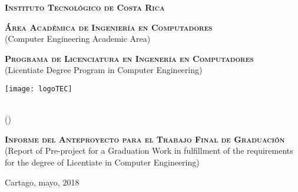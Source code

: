 
\thispagestyle{empty} 

\begin{center}

\textsc{\large \textbf{Instituto Tecnol\'ogico de Costa Rica}} \\
\par\vspace{7mm}


\textsc{\large \textbf{\'Area Acad\'emica de Ingenier\'ia en Computadores}}\\
(Computer Engineering Academic Area)\\
\par\vspace{7mm}

\textsc{\large \textbf{Programa de Licenciatura en Ingener\'ia en Computadores}}\\
(Licentiate Degree Program in Computer Engineering)



\par\vspace{20mm}

\texttt{[image: logoTEC]}

\par\vspace*{\fill}

{\LARGE\bf{\textsf{ \Large \scriptTitle}}}\\
(\scriptEnglishTitle)

\par\vspace*{\fill}

\textsc{\large \textbf{Informe del Anteproyecto para el Trabajo Final de Graduaci\'on}}\\
(Report of Pre-project for a Graduation Work in fulfillment of the requirements for the degree of Licentiate in Computer Engineering)

\par\vspace*{\fill}


\textsc{\large\bf \scriptAuthor}

\vspace*{\fill}

{Cartago, mayo, 2018}

\end{center}
\newpage 
\cleardoublepage  
